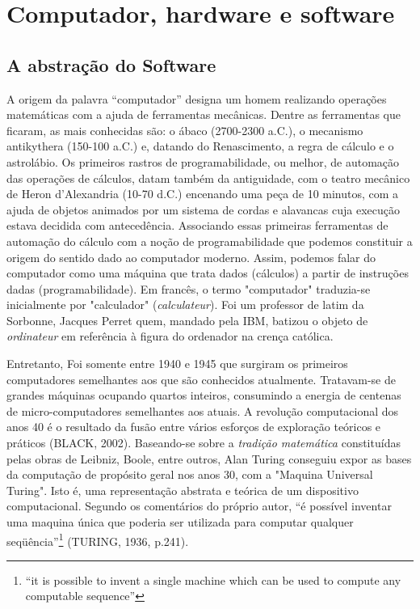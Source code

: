 \section{Computador, hardware e software} \label{1.1}

\subsection{A abstração do Software} \label{1.1.1}

A origem da palavra “computador” designa um homem realizando operações matemáticas com a ajuda de ferramentas mecânicas. Dentre as ferramentas que ficaram, as mais conhecidas são: o ábaco (2700-2300 a.C.), o mecanismo antikythera (150-100 a.C.) e, datando do Renascimento, a regra de cálculo e o astrolábio. Os primeiros rastros de programabilidade, ou melhor, de automação das operações de cálculos, datam também da antiguidade, com o teatro mecânico de Heron d’Alexandria (10-70 d.C.) encenando uma peça de 10 minutos, com a ajuda de objetos animados por um sistema de cordas e alavancas cuja execução estava decidida com antecedência.  Associando essas primeiras ferramentas de automação do cálculo com a noção de programabilidade que podemos constituir a origem do sentido dado ao computador moderno. Assim, podemos falar do computador como uma máquina que trata dados (cálculos) a partir de instruções dadas (programabilidade). Em francês, o termo "computador" traduzia-se inicialmente por "calculador" (\emph{calculateur}). Foi um professor de latim da Sorbonne, Jacques Perret quem, mandado pela IBM, batizou o objeto de \emph{ordinateur} em refer\^encia à figura do ordenador na crença católica.

Entretanto, Foi somente entre 1940 e 1945 que surgiram os primeiros computadores semelhantes aos que são conhecidos atualmente. Tratavam-se de grandes máquinas ocupando quartos inteiros, consumindo a energia de centenas de micro-computadores semelhantes aos atuais. A revolução computacional dos anos 40 é o resultado da fusão entre vários esforços de exploração teóricos e práticos (BLACK, 2002). Baseando-se sobre a \emph{tradição matemática} constituídas pelas obras de Leibniz, Boole, entre outros, Alan Turing conseguiu expor as bases da computação de propósito geral nos anos 30, com a "Maquina Universal Turing". Isto é, uma representação abstrata e teórica de um dispositivo computacional. Segundo os comentários do próprio autor, “é possível inventar uma maquina única que poderia ser utilizada para computar qualquer seqüência”\footnote{“it is possible to invent a single machine which can be used to compute any computable sequence”} (TURING, 1936, p.241).

